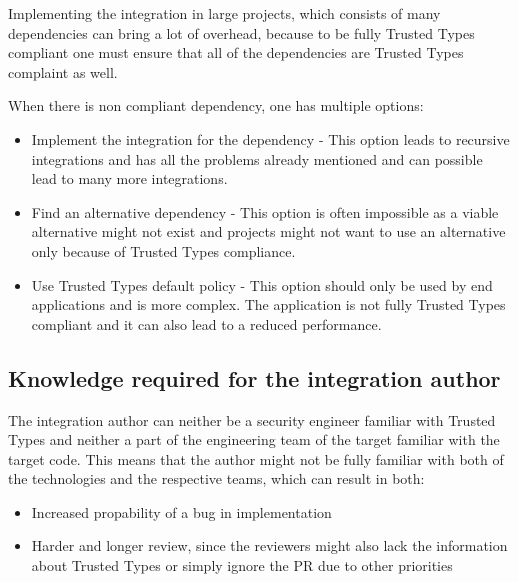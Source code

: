 Implementing the integration in large projects, which consists of many dependencies can bring a lot
of overhead, because to be fully Trusted Types compliant one must ensure that all of the
dependencies are Trusted Types complaint as well.

When there is non compliant dependency, one has multiple options:

\begin{itemize}
  \item Implement the integration for the dependency - This option leads to recursive integrations
        and has all the problems already mentioned and can possible lead to many more integrations.
  \item Find an alternative dependency - This option is often impossible as a viable alternative
        might not exist and projects might not want to use an alternative only because of Trusted
        Types compliance.
  \item Use Trusted Types default policy - This option should only be used by end applications and
        is more complex. The application is not fully Trusted Types compliant and it can also lead
        to a reduced performance.
\end{itemize}

\subsection{Knowledge required for the integration author}
\label{sub:trust_integration_author}

The integration author can neither be a security engineer familiar with Trusted Types and neither a
part of the engineering team of the target familiar with the target code. This means that the author
might not be fully familiar with both of the technologies and the respective teams, which can result
in both:

\begin{itemize}
  \item Increased propability of a bug in implementation
  \item Harder and longer review, since the reviewers might also lack the information about Trusted
        Types or simply ignore the PR due to other priorities
\end{itemize}
